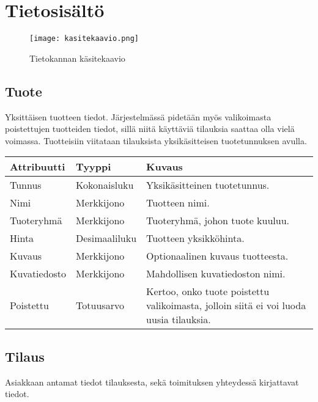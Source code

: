 \documentclass[a4paper, 12pt, finnish]{article}
\begin{document}
\section{Tietosisältö}

\begin{figure}[H]
	\begin{center}
	\caption{Tietokannan käsitekaavio}
	\texttt{[image: kasitekaavio.png]}
	\end{center}
\end{figure}

\subsection*{Tuote}
Yksittäisen tuotteen tiedot. Järjestelmässä pidetään myös valikoimasta poistettujen tuotteiden tiedot, sillä niitä käyttäviä tilauksia saattaa olla vielä voimassa. Tuotteisiin viitataan tilauksista yksikäsitteisen tuotetunnuksen avulla.


\vspace{0.5cm}\hspace{-1cm}
\begin{tabular}{l l p{7cm}}
\textbf{Attribuutti} & \textbf{Tyyppi} & \textbf{Kuvaus} \\
\hline
Tunnus & Kokonaisluku & Yksikäsitteinen tuotetunnus. \\
Nimi & Merkkijono & Tuotteen nimi. \\
Tuoteryhmä & Merkkijono & Tuoteryhmä, johon tuote kuuluu. \\
Hinta & Desimaaliluku & Tuotteen yksikköhinta. \\
Kuvaus & Merkkijono & Optionaalinen kuvaus tuotteesta. \\
Kuvatiedosto & Merkkijono & Mahdollisen kuvatiedoston nimi. \\
Poistettu & Totuusarvo & Kertoo, onko tuote poistettu valikoimasta, jolloin siitä ei voi luoda uusia tilauksia. \\
\end{tabular}

\subsection*{Tilaus}
Asiakkaan antamat tiedot tilauksesta, sekä toimituksen yhteydessä kirjattavat tiedot.
\end{document}
